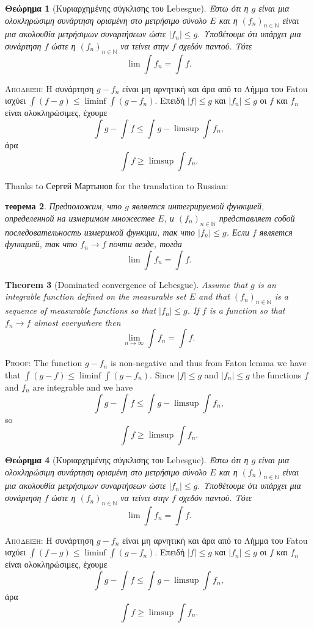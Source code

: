\documentclass{article}
\newtheorem{theorem}{Theorem}
\newtheorem{theoremg}[theorem]{Θεώρημα}
\newtheorem{theoremr}[theorem]{теорема}
\begin{document}

\begin{theoremg}[Κυριαρχημένης σύγκλισης του Lebesgue]
  Έστω ότι
η $g$ είναι μια ολοκληρώσιμη συνάρτηση ορισμένη στο μετρήσιμο σύνολο
$E$ και η $(f_n)_{n\in\mathbb N}$ είναι μια ακολουθία μετρήσιμων συναρτήσεων ώστε
$|f_n| ≤ g$. Υποθέτουμε ότι υπάρχει μια συνάρτηση $f$
ώστε η  $(f_n)_{n\in\mathbb N}$ να
τείνει στην $f$ σχεδόν παντού. Τότε
$$\lim \int f_n =\int f.$$
\end{theoremg}
\textsc{Απόδειξη}: Η συνάρτηση $g − f_n$ είναι μη αρνητική και άρα από
το Λήμμα του Fatou ισχύει
$\int (f-g) ≤ \liminf \int (g-f_n)$. Επειδή
$|f| ≤ g$ και $|f_n| ≤g$ οι $f$ και $f_n$ είναι ολοκληρώσιμες, έχουμε
$$\int g −\int f ≤ \int g − \limsup\int f_n,$$
άρα
$$\int f\geq \limsup \int f_n.$$


Thanks to Сергей Мартынов for the translation to Russian:
\begin{theoremr}
Предположим, что $g$ является
интегрируемой функцией, определенной на измеримом множестве $E$, и
$(f_n)_{n\in\mathbb N}$ представляет собой последовательность измеримой функции, так что
   $|f_n|\leq g$. Если $f$ является функцией, так что $f_n\to f$ почти везде,
   тогда
$$\lim \int f_n =\int f.$$
\end{theoremr}




\newpage


\ttfamily

\begin{theorem}[Dominated convergence of Lebesgue]
Assume that $g$ is an
in\-te\-grable func\-tion defined on the measurable set $E$ and that
  $(f_n)_{n\in\mathbb N}$ is a sequence of mea\-sur\-able functions so that
  $|f_n|\leq g$. If $f$ is a function so that $f_n\to f$ almost everywhere
  then $$\lim_{n\to\infty}\int f_n=\int f.$$
\end{theorem}
\textsc{Proof}: The function $g-f_n$ is non-negative and thus from Fatou lemma
we have that $\int(g-f)\leq\liminf\int(g-f_n)$. Since $|f|\leq g$ and
$|f_n|\leq g$ the  functions $f$ and $f_n$ are integrable and we have
$$\int g-\int f\leq \int g-\limsup\int f_n,$$ so
$$\int f\geq \limsup \int f_n.$$



\begin{theoremg}[Κυριαρχημένης σύγκλισης του Lebesgue]
  Έστω ότι
η $g$ είναι μια ολοκληρώσιμη συνάρτηση ορισμένη στο μετρήσιμο σύνολο
$E$ και η $(f_n)_{n\in\mathbb N}$ είναι μια ακολουθία μετρήσιμων συναρτήσεων ώστε
$|f_n| ≤ g$. Υποθέτουμε ότι υπάρχει μια συνάρτηση $f$
ώστε η  $(f_n)_{n\in\mathbb N}$ να
τείνει στην $f$ σχεδόν παντού. Τότε
$$\lim \int f_n =\int f.$$
\end{theoremg}
\textsc{Απόδειξη}: Η συνάρτηση $g − f_n$ είναι μη αρνητική και άρα από
το Λήμμα του Fatou ισχύει
$\int (f-g) ≤ \liminf \int (g-f_n)$. Επειδή
$|f| ≤ g$ και $|f_n| ≤g$ οι $f$ και $f_n$ είναι ολοκληρώσιμες, έχουμε
$$\int g −\int f ≤ \int g − \limsup\int f_n,$$
άρα
$$\int f\geq \limsup \int f_n.$$
\end{document}
